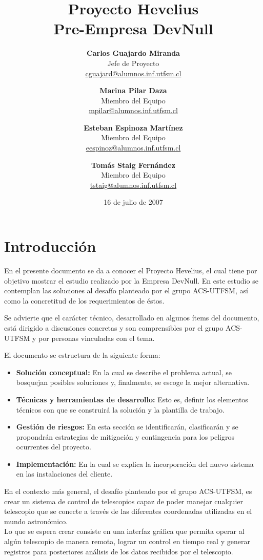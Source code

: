 \documentclass[letterpaper,titlepage,spanish,10pt]{article}
\title{{\Huge \bf Proyecto Hevelius} \\ {\Large Pre-Empresa DevNull}}
\author{
{\bf Carlos Guajardo Miranda} \\ Jefe de Proyecto \\ \url{cguajard@alumnos.inf.utfsm.cl}
\and
{\bf Marina Pilar Daza} \\ Miembro del Equipo \\ \url{mpilar@alumnos.inf.utfsm.cl}
\and
{\bf Esteban Espinoza Mart\'inez} \\ Miembro del Equipo \\ \url{eespinoz@alumnos.inf.utfsm.cl}
\and
{\bf Tom\'as Staig Fern\'andez} \\ Miembro del Equipo \\ \url{tstaig@alumnos.inf.utfsm.cl}
}
\date{16 de julio de 2007}
\begin{document}
\maketitle
\newpage

\tableofcontents{}
\newpage




\section{Introducci\'on}
En el presente documento se da a conocer el Proyecto Hevelius, el cual 
tiene por objetivo mostrar el estudio realizado por la Empresa DevNull. 
En este estudio se contemplan las soluciones al desaf\'io planteado por el grupo
ACS-UTFSM, as\'i como la concretitud de los requerimientos de \'estos.

Se advierte que el car\'acter t\'ecnico, desarrollado en algunos \'items del documento,
est\'a dirigido a discusiones concretas y son comprensibles por el grupo ACS-UTFSM 
y por personas vinculadas con el tema.

El documento se estructura de la siguiente forma:
\begin{itemize}
        \item \textbf{Soluci\'on conceptual:} En la cual se describe el problema 
actual, se bosquejan posibles soluciones y, finalmente, se escoge la mejor alternativa.
        \item \textbf{T\'ecnicas y herramientas de desarrollo:} Esto es, definir 
los elementos t\'ecnicos con que se construir\'a la soluci\'on y la plantilla de trabajo.
        \item \textbf{Gesti\'on de riesgos:} En esta secci\'on se identificar\'an, 
clasificar\'an y se propondr\'an estrategias de mitigaci\'on y contingencia para los 
peligros ocurrentes del proyecto.
        \item \textbf{Implementaci\'on:} En la cual se explica la incorporaci\'on del 
nuevo sistema en las instalaciones del cliente.
\end{itemize}

En el contexto m\'as general, el desaf\'io planteado por el grupo ACS-UTFSM, es 
crear un sistema de control de telescopios capaz de poder manejar cualquier telescopio 
que se conecte a trav\'es de las diferentes coordenadas utilizadas en el mundo 
astron\'omico.\\

Lo que se espera crear consiste en una interfaz gr\'afica que permita operar al 
alg\'un telescopio de manera remota, lograr un control en tiempo real y generar 
registros para posteriores an\'alisis de los datos recibidos por el telescopio.\\
\end{document}
